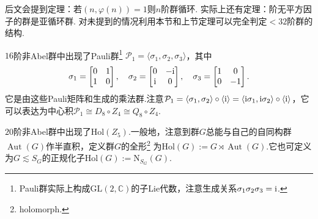 \begin{remark}
	后文会提到定理：若$(n,\varphi(n))=1$则$n$阶群循环.%
	实际上还有定理：阶无平方因子的群是亚循环群.%
	对未提到的情况利用本节和上节定理可以完全判定$<32$阶群的结构.
\end{remark}
\begin{remark}
	$16$阶非Abel群中出现了{\heiti Pauli群}\footnote{Pauli群实际上构成$\mathrm{GL}(2,\mathbb{C})$的子Lie代数，注意生成关系$\sigma_1\sigma_2\sigma_3=\mathrm{i}$.} $\mathcal{P}_1=\langle \sigma_1,\sigma_2,\sigma_3\rangle $，其中
	\[
		\sigma_1=\begin{bmatrix}
			0&1\\
			1&0
		\end{bmatrix},\quad\sigma_2=\begin{bmatrix}
			0&-\mathrm{i}\\
			\mathrm{i}&0
		\end{bmatrix},\quad\sigma_3=\begin{bmatrix}
			1&0\\
			0&-1
		\end{bmatrix}.
	\]
	它是由这些Pauli矩阵和生成的乘法群.注意$\mathcal{P}_1=\langle \sigma_1,\sigma_2\rangle \circ\langle \mathrm{i}\rangle=\langle \mathrm{i}\sigma_1,\mathrm{i}\sigma_2\rangle \circ\langle \mathrm{i}\rangle  $，它可以表达为中心积$\mathcal{P}_1\cong D_8\circ Z_4\cong Q_8\circ Z_4$.
\end{remark}
\begin{remark}
	$20$阶非Abel群中出现了$\mathrm{Hol}(Z_5)$.一般地，注意到群$G$总能与自己的自同构群$\operatorname*{Aut}(G)$作半直积，定义群$G$的{\heiti 全形}\footnote{holomorph.} 为$\mathrm{Hol}(G):=G\rtimes\operatorname*{Aut}(G)$.它也可定义为$G\lesssim S_G$的正规化子$\mathrm{Hol}(G):=\mathrm{N}_{S_G}(G)$.
\end{remark}

